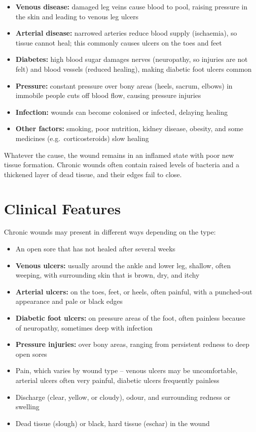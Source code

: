 \begin{itemize}
    \item \textbf{Venous disease:} damaged leg veins cause blood to pool, raising pressure in the skin and leading to venous leg ulcers
    \item \textbf{Arterial disease:} narrowed arteries reduce blood supply (ischaemia), so tissue cannot heal; this commonly causes ulcers on the toes and feet
    \item \textbf{Diabetes:} high blood sugar damages nerves (neuropathy, so injuries are not felt) and blood vessels (reduced healing), making diabetic foot ulcers common
    \item \textbf{Pressure:} constant pressure over bony areas (heels, sacrum, elbows) in immobile people cuts off blood flow, causing pressure injuries
    \item \textbf{Infection:} wounds can become colonised or infected, delaying healing
    \item \textbf{Other factors:} smoking, poor nutrition, kidney disease, obesity, and some medicines (e.g.\ corticosteroids) slow healing
\end{itemize}

Whatever the cause, the wound remains in an inflamed state with poor new tissue formation. Chronic wounds often contain raised levels of bacteria and a thickened layer of dead tissue, and their edges fail to close.

\section*{Clinical Features}
Chronic wounds may present in different ways depending on the type:

\begin{itemize}
    \item An open sore that has not healed after several weeks
    \item \textbf{Venous ulcers:} usually around the ankle and lower leg, shallow, often weeping, with surrounding skin that is brown, dry, and itchy
    \item \textbf{Arterial ulcers:} on the toes, feet, or heels, often painful, with a punched-out appearance and pale or black edges
    \item \textbf{Diabetic foot ulcers:} on pressure areas of the foot, often painless because of neuropathy, sometimes deep with infection
    \item \textbf{Pressure injuries:} over bony areas, ranging from persistent redness to deep open sores
    \item Pain, which varies by wound type -- venous ulcers may be uncomfortable, arterial ulcers often very painful, diabetic ulcers frequently painless
    \item Discharge (clear, yellow, or cloudy), odour, and surrounding redness or swelling
    \item Dead tissue (slough) or black, hard tissue (eschar) in the wound
\end{itemize}

